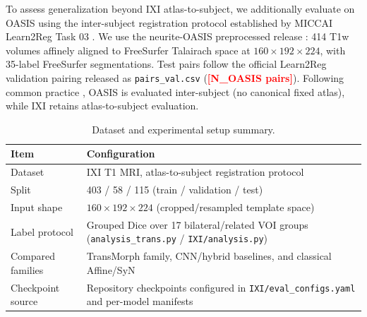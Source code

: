 \documentclass[jimaging,article,submit,pdftex,moreauthors]{Definitions/mdpi}
\providecommand{\PH}[1]{\textcolor{red}{\textbf{[#1]}}}
\begin{document}
To assess generalization beyond IXI atlas-to-subject, we additionally evaluate on OASIS using the inter-subject registration protocol established by MICCAI Learn2Reg Task 03 \citep{hering2022learn2reg}. We use the neurite-OASIS preprocessed release \citep{hoopes2022hypermorph}: 414 T1w volumes affinely aligned to FreeSurfer Talairach space at \(160\times192\times224\), with 35-label FreeSurfer segmentations. Test pairs follow the official Learn2Reg validation pairing released as \texttt{pairs\_val.csv} (\PH{N\_OASIS pairs}). Following common practice \citep{chen2022transmorph,hoopes2022hypermorph}, OASIS is evaluated inter-subject (no canonical fixed atlas), while IXI retains atlas-to-subject evaluation.

\begin{table}[H]
\caption{Dataset and experimental setup summary.\label{tab1}}
\begin{tabularx}{\textwidth}{lX}
\toprule
\textbf{Item} & \textbf{Configuration} \\
\midrule
Dataset & IXI T1 MRI, atlas-to-subject registration protocol \\
Split & 403 / 58 / 115 (train / validation / test) \\
Input shape & \(160 \times 192 \times 224\) (cropped/resampled template space) \\
Label protocol & Grouped Dice over 17 bilateral/related VOI groups (\texttt{analysis\_trans.py} / \texttt{IXI/analysis.py}) \\
Compared families & TransMorph family, CNN/hybrid baselines, and classical Affine/SyN \\
Checkpoint source & Repository checkpoints configured in \texttt{IXI/eval\_configs.yaml} and per-model manifests \\
\bottomrule
\end{tabularx}
\end{table}
\end{document}
